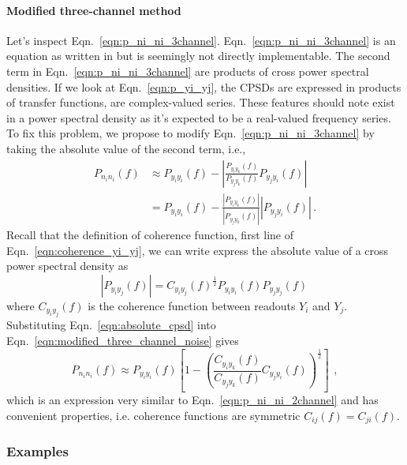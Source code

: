 \paragraph{Modified three-channel method}

Let's inspect Eqn.~\eqref{eqn:p_ni_ni_3channel}.
Eqn.~\eqref{eqn:p_ni_ni_3channel} is an equation as written in \cite{Sleeman2006ThreeChannelCA} but is seemingly not directly implementable.
The second term in Eqn.~\eqref{eqn:p_ni_ni_3channel} are products of cross power spectral densities.
If we look at Eqn.~\eqref{eqn:p_yi_yj}, the CPSDs are expressed in products of transfer functions, are complex-valued series.
These features should note exist in a power spectral density as it's expected to be a real-valued frequency series.
To fix this problem, we propose to modify Eqn.~\ref{eqn:p_ni_ni_3channel} by taking the absolute value of the second term, i.e.,
\begin{equation}
	\begin{split}
		P_{n_in_i}(f) &\approx P_{y_iy_i}(f) - \left\lvert\frac{P_{y_iy_k}(f)}{P_{y_jy_k}(f)}P_{y_jy_i}(f)\right\rvert\\
		&= P_{y_iy_i}(f) - \frac{\left\lvert P_{y_iy_k}(f)\right\rvert}{\left\lvert P_{y_jy_k}(f)\right\rvert}\left\lvert P_{y_jy_i}(f)\right\rvert\,.
	\end{split}
	\label{eqn:modified_three_channel_noise}
\end{equation}
Recall that the definition of coherence function, first line of Eqn.~\eqref{eqn:coherence_yi_yj}, we can write express the absolute value of a cross power spectral density as
\begin{equation}
	\left\lvert P_{y_iy_j}(f)\right\rvert = C_{y_iy_j}(f)^{\frac{1}{2}}P_{y_iy_i}(f)P_{y_jy_j}(f)\,
	\label{eqn:absolute_cpsd}
\end{equation}
where $C_{y_iy_j}(f)$ is the coherence function between readouts $Y_i$ and $Y_j$.
Substituting Eqn.~\eqref{eqn:absolute_cpsd} into Eqn.~\eqref{eqn:modified_three_channel_noise} gives
\begin{equation}
	\boxed{
		P_{n_in_i}(f) \approx 	P_{y_iy_i}(f)\left[1-\left(\frac{C_{y_iy_k}(f)}{C_{y_jy_k}(f)}C_{y_jy_i}(f)\right)^\frac{1}{2}\right]
	}\,\ ,
	\label{eqn:modified_p_ni_ni_3channel}
\end{equation}
which is an expression very similar to Eqn.~\ref{eqn:p_ni_ni_2channel} and has convenient properties, i.e. coherence functions are symmetric $C_{ij}(f) = C_{ji}(f)$.

\subsubsection{Examples}

